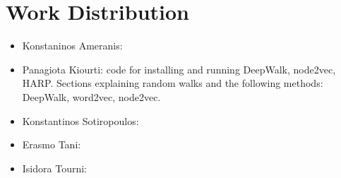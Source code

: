 \section{Work Distribution}
\begin{itemize}
\item Konstaninos Ameranis:
\item Panagiota Kiourti: code for installing and running DeepWalk, node2vec, HARP. Sections explaining random walks and the following methods: DeepWalk, word2vec, 
node2vec.
\item Konstantinos Sotiropoulos:
\item Erasmo Tani:
\item Isidora Tourni: 
\end{itemize}

